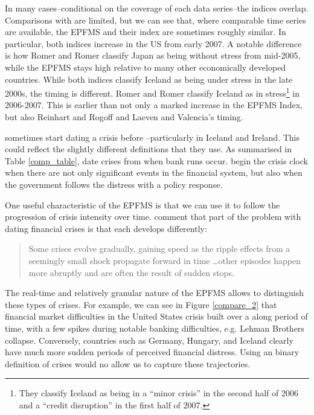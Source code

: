 \documentclass[]{article}
\begin{document}
In many cases--conditional on the coverage of each data series--the indices overlap. Comparisons with \cite{Romer2015} are limited, but we can see that, where comparable time series are available, the EPFMS and their index are sometimes roughly similar. In particular, both indices increase in the US from early 2007. A notable difference is how Romer and Romer classify Japan as being without stress from mid-2005, while the EPFMS stays high relative to many other economically developed countries. While both indices classify Iceland as being under stress in the late 2000s, the timing is different. Romer and Romer classify Iceland as in stress\footnote{They classify Iceland as being in a ``minor crisis'' in the second half of 2006 and a ``credit  disruption'' in the first half of 2007.} in 2006-2007. This is earlier than not only a marked increase in the EPFMS Index, but also Reinhart and Rogoff and Laeven and Valencia's timing.

\cite{Reinhart2009} sometimes start dating a crisis before \cite{laeven2013}--particularly in Iceland and Ireland. This could reflect the slightly different definitions that they use. As summarised in Table \ref{comp_table}, \cite{Reinhart2009} date crises from when bank runs occur. \cite{laeven2013} begin the crisis clock when there are not only significant events in the financial system, but also when the government follows the distress with a policy response.

One useful characteristic of the EPFMS is that we can use it to follow the progression of crisis intensity over time. \cite[227]{laeven2013} comment that part of the problem with dating financial crises is that each develops differently:

\begin{quote}
    Some crises evolve gradually, gaining speed as the ripple effects from a seemingly small shock propagate forward in time \ldots other episodes happen more abruptly and are often the result of sudden stops.
\end{quote}

\noindent The real-time and relatively granular nature of the EPFMS allows to distinguish these types of crises. For example, we can see in Figure \ref{compare_2} that financial market difficulties in the United States crisis built over a along period of time, with a few spikes during notable banking difficulties, e.g. Lehman Brothers collapse. Conversely, countries such as Germany, Hungary, and Iceland clearly have much more sudden periods of perceived financial distress. Using an binary definition of crises would no allow us to capture these trajectories.
\end{document}
